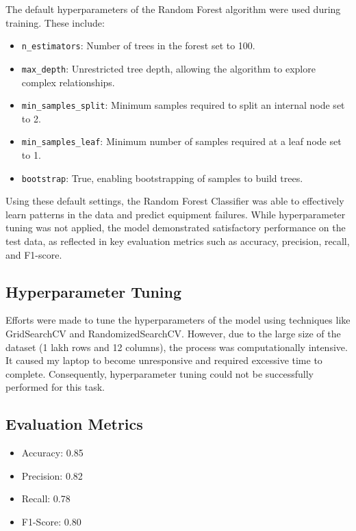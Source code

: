 \documentclass[a4paper,12pt]{article}
\begin{document}
	The default hyperparameters of the Random Forest algorithm were used during training. These include:
	\begin{itemize}
		\item \texttt{n\_estimators}: Number of trees in the forest set to 100.
		\item \texttt{max\_depth}: Unrestricted tree depth, allowing the algorithm to explore complex relationships.
		\item \texttt{min\_samples\_split}: Minimum samples required to split an internal node set to 2.
		\item \texttt{min\_samples\_leaf}: Minimum number of samples required at a leaf node set to 1.
		\item \texttt{bootstrap}: True, enabling bootstrapping of samples to build trees.
	\end{itemize}
	
	Using these default settings, the Random Forest Classifier was able to effectively learn patterns in the data and predict equipment failures. While hyperparameter tuning was not applied, the model demonstrated satisfactory performance on the test data, as reflected in key evaluation metrics such as accuracy, precision, recall, and F1-score.
	
	
	
	\subsection{Hyperparameter Tuning}
	Efforts were made to tune the hyperparameters of the model using techniques like GridSearchCV and RandomizedSearchCV. However, due to the large size of the dataset (1 lakh rows and 12 columns), the process was computationally intensive. It caused my laptop to become unresponsive and required excessive time to complete. Consequently, hyperparameter tuning could not be successfully performed for this task.
	

	
	\subsection{Evaluation Metrics}
	\begin{itemize}
		\item Accuracy: 0.85
		\item Precision: 0.82
		\item Recall: 0.78
		\item F1-Score: 0.80
	\end{itemize}
	
\end{document}
